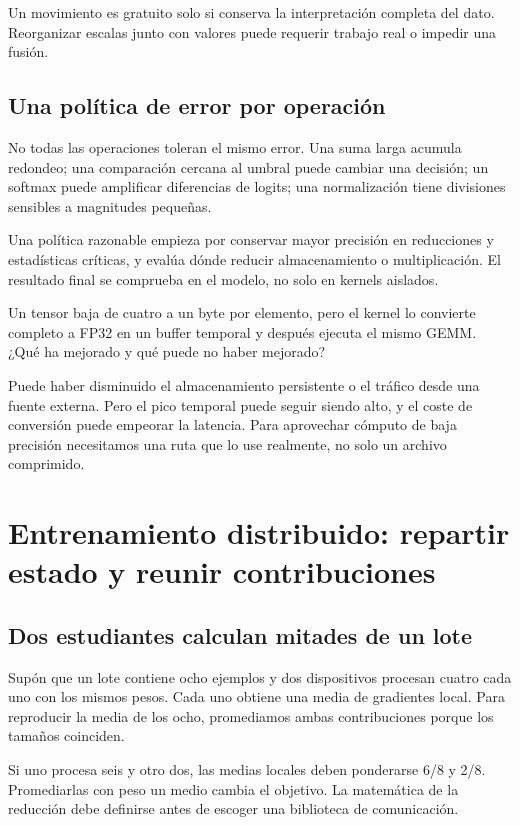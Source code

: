 \documentclass[12pt,a4paper,oneside]{report}
\begin{document}
Un movimiento es gratuito solo si conserva la interpretación completa del dato. Reorganizar escalas junto con valores puede requerir trabajo real o impedir una fusión.

\section{Una política de error por operación}
No todas las operaciones toleran el mismo error. Una suma larga acumula redondeo; una comparación cercana al umbral puede cambiar una decisión; un softmax puede amplificar diferencias de logits; una normalización tiene divisiones sensibles a magnitudes pequeñas.

Una política razonable empieza por conservar mayor precisión en reducciones y estadísticas críticas, y evalúa dónde reducir almacenamiento o multiplicación. El resultado final se comprueba en el modelo, no solo en kernels aislados.

\begin{practica}
Un tensor baja de cuatro a un byte por elemento, pero el kernel lo convierte completo a FP32 en un buffer temporal y después ejecuta el mismo GEMM. ¿Qué ha mejorado y qué puede no haber mejorado?

\end{practica}
Puede haber disminuido el almacenamiento persistente o el tráfico desde una fuente externa. Pero el pico temporal puede seguir siendo alto, y el coste de conversión puede empeorar la latencia. Para aprovechar cómputo de baja precisión necesitamos una ruta que lo use realmente, no solo un archivo comprimido.

\chapter{Entrenamiento distribuido: repartir estado y reunir contribuciones}
\label{ch:distribuido}
\section{Dos estudiantes calculan mitades de un lote}
Supón que un lote contiene ocho ejemplos y dos dispositivos procesan cuatro cada uno con los mismos pesos. Cada uno obtiene una media de gradientes local. Para reproducir la media de los ocho, promediamos ambas contribuciones porque los tamaños coinciden.

Si uno procesa seis y otro dos, las medias locales deben ponderarse 6/8 y 2/8. Promediarlas con peso un medio cambia el objetivo. La matemática de la reducción debe definirse antes de escoger una biblioteca de comunicación.
\end{document}
